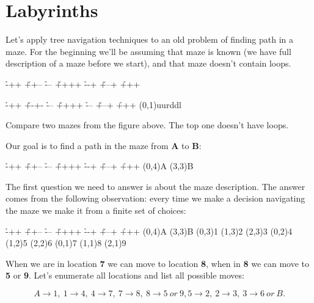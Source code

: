 \chapter{Labyrinths}

Let's apply tree navigation techniques to an old problem
of finding path in a maze. For the beginning we'll be assuming that
maze is known (we have full description of a maze before we start),
and that maze doesn't contain loops.

\begin{labyrinth}{3}{4}
        \h -++
\v ++-- \h ---
\v ++++ \h --+
\v +--+ \h +++
\end{labyrinth}
\begin{labyrinth}{3}{4}
        \h -++
\v +-+- \h ---
\v ++++ \h ---
\v +--+ \h +++
\labyrinthsolution(0,1){uurddl}
\end{labyrinth}

Compare two mazes from the figure above. The top one doesn't have
loops. 

Our goal is to find a path in the maze from \textbf{A} to \textbf{B}:

\begin{labyrinth}{3}{4}
        \h -++
\v ++-- \h ---
\v ++++ \h --+
\v +--+ \h +++
\putsymbol(0,4){\small{A}}
\putsymbol(3,3){\small{B}}
\end{labyrinth}


The first question we need to answer is about the maze description.
The answer comes from the following observation: every time we
make a decision navigating the maze we make it from a finite set
of choices:

\begin{labyrinth}{3}{4}
        \h -++
\v ++-- \h ---
\v ++++ \h --+
\v +--+ \h +++
\putsymbol(0,4){\small{A}}
\putsymbol(3,3){\small{B}}
\putsymbol(0,3){\small{1}}
\putsymbol(1,3){\small{2}}
\putsymbol(2,3){\small{3}}
\putsymbol(0,2){\small{4}}
\putsymbol(1,2){\small{5}}
\putsymbol(2,2){\small{6}}
\putsymbol(0,1){\small{7}}
\putsymbol(1,1){\small{8}}
\putsymbol(2,1){\small{9}}
\end{labyrinth}


When we are in location \textbf{7} we can move to location 
\textbf{8}, when in \textbf{8} we can move to \textbf{5} or \textbf{9}.
Let's enumerate all locations and list all possible moves:

$$A\rightarrow 1,\ 1\rightarrow 4,\ 
4\rightarrow 7,\ 7\rightarrow 8,\ 8\rightarrow 5\ or\ 9,
5\rightarrow 2,\ 2\rightarrow 3,\ 3\rightarrow 6\ or\ B.$$

